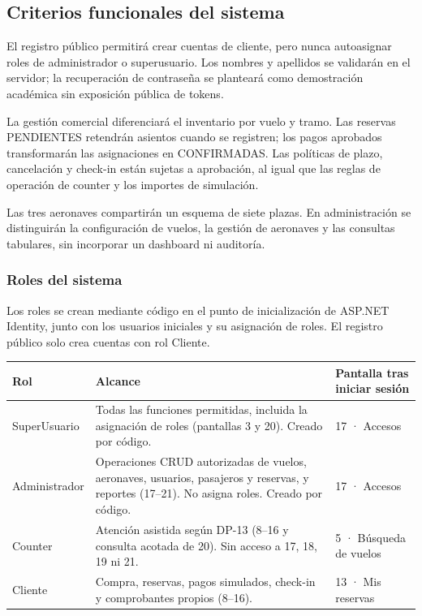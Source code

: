 \documentclass[11pt,a4paper]{article}
\begin{document}
\subsection{Criterios funcionales del sistema}
El registro público permitirá crear cuentas de cliente, pero nunca autoasignar roles de administrador o superusuario. Los nombres y apellidos se validarán en el servidor; la recuperación de contraseña se planteará como demostración académica sin exposición pública de tokens.

La gestión comercial diferenciará el inventario por vuelo y tramo. Las reservas PENDIENTES retendrán asientos cuando se registren; los pagos aprobados transformarán las asignaciones en CONFIRMADAS. Las políticas de plazo, cancelación y check-in están sujetas a aprobación, al igual que las reglas de operación de counter y los importes de simulación.

Las tres aeronaves compartirán un esquema de siete plazas. En administración se distinguirán la configuración de vuelos, la gestión de aeronaves y las consultas tabulares, sin incorporar un dashboard ni auditoría.

\subsubsection*{Roles del sistema}
Los roles se crean mediante código en el punto de inicialización de ASP.NET Identity, junto con los usuarios iniciales y su asignación de roles. El registro público solo crea cuentas con rol Cliente.

\begin{tabularx}{\textwidth}{@{}p{2.6cm}Xp{3.6cm}@{}}
\toprule
\textbf{Rol} & \textbf{Alcance} & \textbf{Pantalla tras iniciar sesión}\\\midrule
SuperUsuario & Todas las funciones permitidas, incluida la asignación de roles (pantallas 3 y 20). Creado por código. & 17 · Accesos\\
Administrador & Operaciones CRUD autorizadas de vuelos, aeronaves, usuarios, pasajeros y reservas, y reportes (17--21). No asigna roles. Creado por código. & 17 · Accesos\\
Counter & Atención asistida según DP-13 (8--16 y consulta acotada de 20). Sin acceso a 17, 18, 19 ni 21. & 5 · Búsqueda de vuelos\\
Cliente & Compra, reservas, pagos simulados, check-in y comprobantes propios (8--16). & 13 · Mis reservas\\\bottomrule
\end{tabularx}
\end{document}
